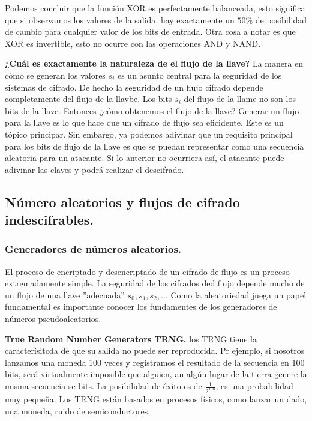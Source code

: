 \documentclass{llncs}
\theoremstyle{plane}
\begin{document}
Podemos concluir que la función XOR es perfectamente balanceada, esto significa que si observamos los valores de la salida, hay exactamente un $50\%$ de posibilidad de cambio para cualquier valor de los bits de entrada. Otra cosa a notar es que XOR es invertible, esto no ocurre con las operaciones AND y NAND.  


\textbf{¿Cuál es exactamente la naturaleza de el flujo de la llave?}
La manera en cómo se generan los valores $s_{i}$ es un asunto central para la seguridad de los sistemas de cifrado. De hecho la seguridad de un flujo cifrado depende completamente del flujo de la llavbe. Los bits $s_{i}$ del flujo de la llame no son los bits de la llave. Entonces ¿cómo obtenemos el flujo de la llave? Generar un flujo para la llave es lo que hace que un cifrado de flujo sea eficidente. Este es un tópico principar. Sin embargo, ya podemos adivinar que un requisito principal para los bits de flujo de la llave es que se puedan representar como una secuencia aleatoria para un atacante. Si lo anterior no ocurriera así, el atacante puede adivinar las claves y podrá realizar el descifrado. 


\subsection{Número aleatorios y flujos de cifrado indescifrables.}

\subsubsection{Generadores de números aleatorios.}
El proceso de encriptado y desencriptado de un cifrado de flujo es un proceso extremadamente simple. La seguridad de los cifrados ded flujo depende mucho de un flujo de una llave  ''adecuada'' $s_{0}, s_{1}, s_{2}, ...$ Como la aleatoriedad juega un papel fundamental es importante conocer los fundamentes de los generadores de números pseudoaleatorios.

\textbf{True Random Number Generators TRNG.}
los TRNG tiene la caracterísitcda de que su salida no puede ser reproducida. Pr ejemplo, si nosotros lanzamos una moneda 100 veces y registramos el resultado de la secuencia en 100 bits, será virtualmente imposible que alguien, an algún lugar de la tierra genere la misma secuencia se bits. La posibilidad de éxito es de $\frac{1}{2^{100}}$, es una probabilidad muy pequeña. Los TRNG están basados en procesos físicos, como lanzar un dado, una moneda, ruido de semiconductores. 
\end{document}
